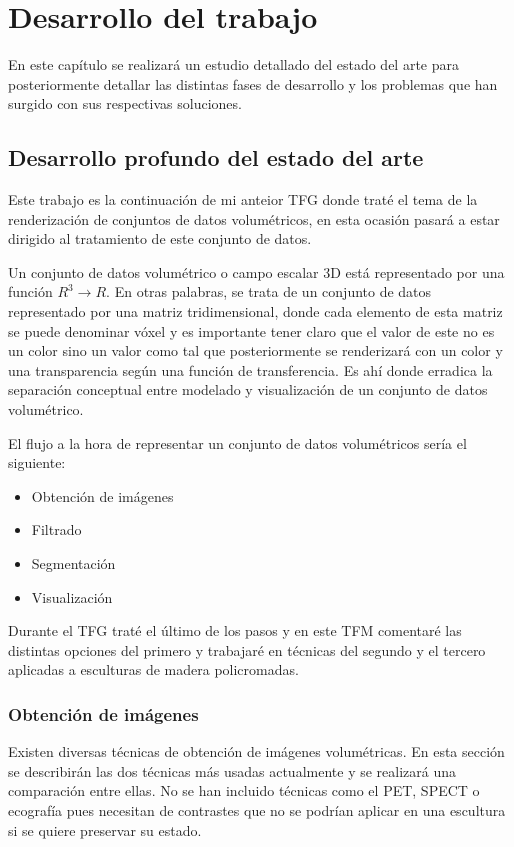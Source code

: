 \chapter{Desarrollo del trabajo}

En este capítulo se realizará un estudio detallado del estado del arte para posteriormente detallar las distintas fases de desarrollo y los problemas que han surgido con sus respectivas soluciones.

\section{Desarrollo profundo del estado del arte}

Este trabajo es la continuación de mi anteior TFG donde traté el tema de la renderización de conjuntos de datos volumétricos, en esta ocasión pasará a estar dirigido al tratamiento de este conjunto de datos.

Un conjunto de datos volumétrico o campo escalar 3D está representado por una función $R^{3} \rightarrow R$. En otras palabras, se trata de un conjunto de datos representado por una matriz tridimensional, donde cada elemento de esta matriz se puede denominar vóxel y es importante tener claro que el valor de este no es un color sino un valor como tal que posteriormente se renderizará con un color y una transparencia según una función de transferencia. Es ahí donde erradica la separación conceptual entre modelado y visualización de un conjunto de datos volumétrico.

El flujo a la hora de representar un conjunto de datos volumétricos sería el siguiente:

\begin{itemize}
	\item Obtención de imágenes
	\item Filtrado
	\item Segmentación
	\item Visualización
\end{itemize}

Durante el TFG traté el último de los pasos y en este TFM comentaré las distintas opciones del primero y trabajaré en técnicas del segundo y el tercero aplicadas a esculturas de madera policromadas.

\subsection{Obtención de imágenes}

Existen diversas técnicas de obtención de imágenes volumétricas. En esta sección se describirán las dos técnicas más usadas actualmente y se realizará una comparación entre ellas. No se han incluido técnicas como el PET, SPECT o ecografía pues necesitan de contrastes que no se podrían aplicar en una escultura si se quiere preservar su estado.

